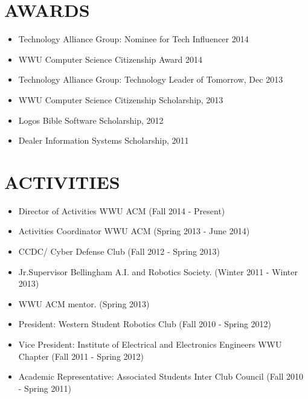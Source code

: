 \documentclass[line,margin]{res}
\begin{document}
\begin{resume}
	
\section{AWARDS}
	\begin{itemize} \itemsep -3pt
		\item Technology Alliance Group: Nominee for Tech Influencer 2014
		\item WWU Computer Science Citizenship Award 2014
		\item Technology Alliance Group: Technology Leader of Tomorrow, Dec 2013
		\item WWU Computer Science Citizenship Scholarship, 2013
		\item Logos Bible Software Scholarship, 2012
		\item Dealer Information Systems Scholarship, 2011
	\end{itemize}

\section{ACTIVITIES} 
	\begin{itemize} \itemsep -3pt
	\item Director of Activities WWU ACM {\footnotesize (Fall 2014 - Present)}
	\item Activities Coordinator WWU ACM {\footnotesize (Spring 2013 - June 2014)}
	\item CCDC/ Cyber Defense Club {\footnotesize (Fall 2012 - Spring 2013)}
	\item Jr.Supervisor Bellingham A.I. and Robotics Society. {\footnotesize (Winter 2011 - Winter 2013)}
	\item WWU ACM mentor. {\footnotesize (Spring 2013)}
	\item President: Western Student Robotics Club {\footnotesize(Fall 2010 - Spring 2012)}
 	\item Vice President: Institute of Electrical and Electronics Engineers WWU Chapter {\footnotesize(Fall 2011 - Spring 2012)}
	\item Academic Representative: Associated Students Inter Club Council {\footnotesize (Fall 2010 - Spring 2011)}
	\end{itemize}
	
\end{resume}
\end{document}
